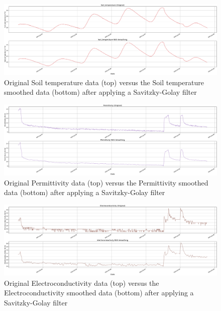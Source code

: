 \begin{figure}[htbp]
    \centering
    \includegraphics[width=15 cm]{5_ChapterDesign/figuras/2_Smoothing/Smoothing_Soil_temperature}
    \caption{Original Soil temperature data (top) versus the Soil temperature smoothed data (bottom) after applying a Savitzky-Golay filter}
\end{figure}

\begin{figure}[htbp]
    \centering
    \includegraphics[width=15 cm]{5_ChapterDesign/figuras/2_Smoothing/Smoothing_Permittivity}
    \caption{Original Permittivity data (top) versus the Permittivity smoothed data (bottom) after applying a Savitzky-Golay filter}
\end{figure}

\begin{figure}[htbp]
    \centering
    \includegraphics[width=15 cm]{5_ChapterDesign/figuras/2_Smoothing/Smoothing_Electroconductivity}
    \caption{Original Electroconductivity data (top) versus the Electroconductivity smoothed data (bottom) after applying a Savitzky-Golay filter}
\end{figure}

